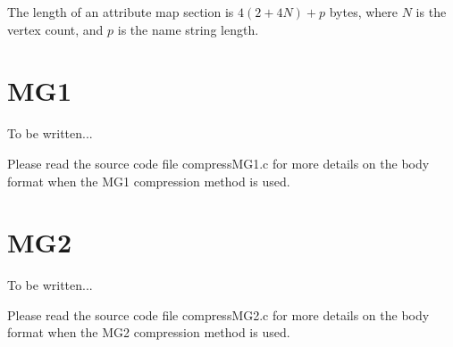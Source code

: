 The length of an attribute map section is $4(2+4N)+p$ bytes, where $N$ is the vertex
count, and $p$ is the name string length.


\section{MG1}
To be written...

Please read the source code file compressMG1.c for more details on the body
format when the MG1 compression method is used.


\section{MG2}
To be written...

Please read the source code file compressMG2.c for more details on the body
format when the MG2 compression method is used.


